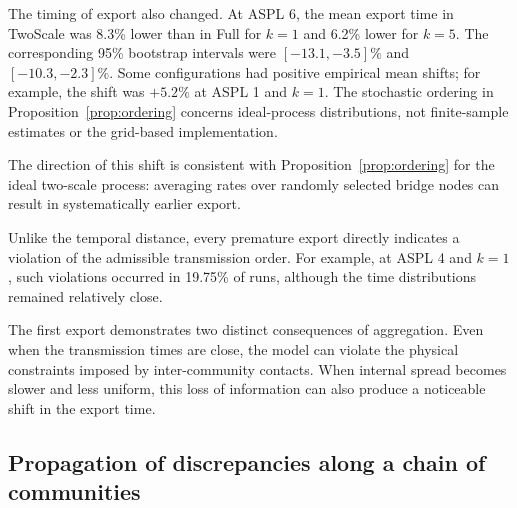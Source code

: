 \documentclass{ieeeaccess}
\newcommand{\michael}[2]{{\color{RoyalBlue}#1}}
\newcommand{\yulian}[2]{{\color{red}#1}}
\newcommand{\Full}{\textup{Full}}
\newcommand{\TS}{\textup{TwoScale}}
\newcommand{\eW}{e_{W}}
\begin{document}
The timing of export also changed. At ASPL 6, the mean export time in \TS{} was 8.3\% lower than in \Full{} for $k=1$ and 6.2\% lower for $k=5$. The corresponding 95\% bootstrap intervals were $[-13.1,-3.5]\%$ and $[-10.3,-2.3]\%$. \michael{Some configurations had positive empirical mean shifts; for example, the shift was $+5.2\%$ at ASPL 1 and $k=1$. The stochastic ordering in Proposition~\ref{prop:ordering} concerns ideal-process distributions, not finite-sample estimates or the grid-based implementation.}{A positive shift in the mean export time was not observed in any configuration in this series.}

The direction of this shift is consistent with Proposition~\ref{prop:ordering} for the ideal two-scale process: averaging rates over randomly selected bridge nodes can result in systematically earlier export.

\yulian{}{Sampling variability must be considered when interpreting the Wasserstein distance. \michael{For independent samples of size $R$ from an exponential distribution with mean $\mu$, the large-$R$ approximation is $\mathbb{E}[W_1]/\mu\approx\sqrt{\pi/R}$, giving about $8.9\%$ for $R=400$ (Appendix~\ref*{app:floor}). This is an illustrative sampling baseline, not the critical value for our paired permutation tests.}{For nearly exponential export times with $R=400$, the expected normalised distance between two independent samples from the same distribution is approximately $\sqrt{\pi/R}\approx9\%$ (Appendix~\ref*{app:floor}).} Small values of $\eW$ for a single export therefore do not, by themselves, indicate a difference between the models.}

Unlike the temporal distance, every premature export directly indicates a violation of the admissible transmission order. For example, at ASPL 4 and $k=1$, such violations occurred in 19.75\% of runs, although the time distributions remained relatively close.

The first export demonstrates two distinct consequences of aggregation. Even when the transmission times are close, the model can violate the physical constraints imposed by inter-community contacts. When internal spread becomes slower and less uniform, this loss of information can also produce a noticeable shift in the export time.

\subsection{Propagation of discrepancies along a chain of communities}
\label{sec:res_chain_random}
\end{document}
